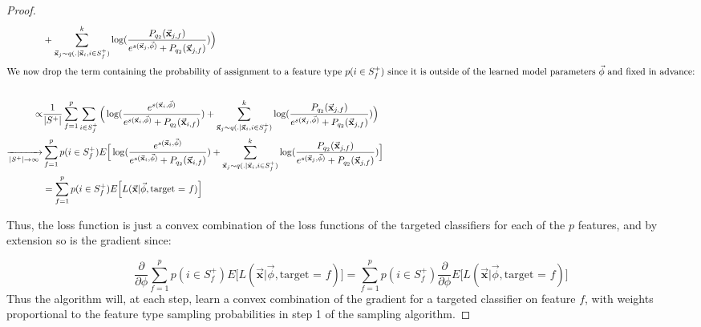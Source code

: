 \documentclass{article} %
\begin{document}
\begin{proof}
\begin{align*}
  &   +  \sum_{\vec{\mathbf{x}}_{j} \sim q(.|\vec{\mathbf{x}}_i,i\in S^+_f)}^k \log(\frac{ P_{q_2}(\vec{\mathbf{x}}_{j,f})}{e^{s(\vec{\mathbf{x}}_{j},\vec{\phi}) } + P_{q_2}(\vec{\mathbf{x}}_{j,f})})   \Big) \\
\intertext{We now drop the term containing the probability of assignment to a feature type $p(i \in S^+_f)$ since it is outside of the learned model parameters $\vec{\phi}$ and fixed in advance:}\\
    \propto & \frac{1}{|S^+|} \sum_{f=1}^p \sum_{i \in S^+_f} \Big( \log(\frac{e^{s(\vec{\mathbf{x}}_i,\vec{\phi}) }}{e^{s(\vec{\mathbf{x}}_i,\vec{\phi}) } + P_{q_2}(\vec{\mathbf{x}}_{i,f}) }) + \sum_{\vec{\mathbf{x}}_{j} \sim q(.|\vec{\mathbf{x}}_i,i\in S^+_f)}^k \log(\frac{ P_{q_2}(\vec{\mathbf{x}}_{j,f})}{e^{s(\vec{\mathbf{x}}_{j},\vec{\phi}) } + P_{q_2}(\vec{\mathbf{x}}_{j,f})}) \Big) \\
    \xrightarrow[|S^+|\rightarrow \infty]{ }  & \sum_{f=1}^p p(i \in S^+_f) E\Big[ \log(\frac{e^{s(\vec{\mathbf{x}}_i,\vec{\phi}) }}{e^{s(\vec{\mathbf{x}}_i,\vec{\phi}) } + P_{q_2}(\vec{\mathbf{x}}_{i,f}) }) + \sum_{\vec{\mathbf{x}}_{j} \sim q(.|\vec{\mathbf{x}}_i,i\in S^+_f)}^k \log(\frac{ P_{q_2}(\vec{\mathbf{x}}_{j,f})}{e^{s(\vec{\mathbf{x}}_{j},\vec{\phi}) } + P_{q_2}(\vec{\mathbf{x}}_{j,f})}) \Big] \\
   & = \sum_{f=1}^p p(i \in S^+_f) E\Big[ L(\vec{\mathbf{x}} |\vec{\phi}, \text{target = $f$}) \Big]
\end{align*}

Thus, the loss function is just a convex combination  of the loss functions of the targeted classifiers for each of the $p$ features, and by extension so is the gradient since:

\[\frac{\partial }{\partial \phi}\sum_{f=1}^p p(i \in S^+_f) E\Big[ L(\vec{\mathbf{x}} |\vec{\phi}, \text{target = $f$}) \Big] =
 \sum_{f=1}^p p(i \in S^+_f) \frac{\partial }{\partial \phi}E\Big[ L(\vec{\mathbf{x}} |\vec{\phi}, \text{target = $f$}) \Big]\]
 Thus the algorithm will, at each step, learn a convex combination of the gradient for a targeted classifier on feature $f$, with weights proportional to the feature type sampling probabilities in step 1 of the sampling algorithm.
\end{proof}
\end{document}
